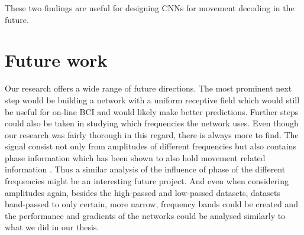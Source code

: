 These two findings are useful for designing CNNs for movement decoding in the future.

\section*{Future work}
Our research offers a wide range of future directions.
The most prominent next step would be building a network with a uniform receptive field which would still be useful for on-line BCI and would likely make better predictions.
Further steps could also be taken in studying which frequencies the network uses.
Even though our research was fairly thorough in this regard, there is always more to find.
The signal consist not only from amplitudes of different frequencies but also contains phase information which has been shown to also hold movement related information \cite{Hammer-2021, hartmann-hierarchical-2018}. 
Thus a similar analysis of the influence of phase of the different frequencies might be an interesting future project.
And even when considering amplitudes again, besides the high-passed and low-passed datasets, datasets band-passed to only certain, more narrow, frequency bands could be created and the performance and gradients of the networks could be analysed similarly to what we did in our thesis.



